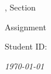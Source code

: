 \ifx\CROWDMARK\undefined

\ifx\assignmenttitle\undefined
\newcommand{\assignmenttitle}{Assignment \assignmentnum}
\fi
\begin{titlepage}
\centering

\vspace*{2.5cm}
        
{\Large \coursename, Section \coursesec
\vspace{0.5cm}

\assignmenttitle}

\vspace{3.5cm}
        
\studentname

\vspace{.5cm}

Student ID: \studentid
\vspace{3.5cm}

\textit{\today}

\end{titlepage}
   
\fi